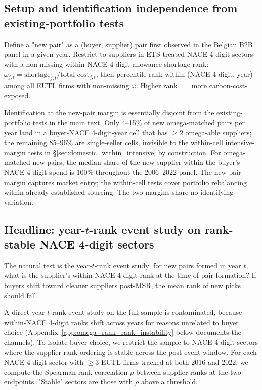 \subsection{Setup and identification independence from existing-portfolio tests}\label{app:omega_rank_setup}

Define a "new pair" as a (buyer, supplier) pair first observed in the Belgian B2B panel in a given year. Restrict to suppliers in ETS-treated NACE 4-digit sectors with a non-missing within-NACE 4-digit allowance-shortage rank: $\omega_{j,t} = \text{shortage}_{j,t} / \text{total cost}_{j,t}$, then percentile-rank within (NACE 4-digit, year) among all EUTL firms with non-missing $\omega$. Higher rank $=$ more carbon-cost-exposed.

Identification at the new-pair margin is essentially disjoint from the existing-portfolio tests in the main text. Only 4--15\% of new omega-matched pairs per year land in a buyer-NACE 4-digit-year cell that has $\geq 2$ omega-able suppliers; the remaining 85--96\% are single-seller cells, invisible to the within-cell intensive-margin tests in §\ref{sec:domestic_within_intensive} by construction. For omega-matched new pairs, the median share of the new supplier within the buyer's NACE 4-digit spend is $100\%$ throughout the 2006--2022 panel. The new-pair margin captures market entry; the within-cell tests cover portfolio rebalancing within already-established sourcing. The two margins share no identifying variation.

\subsection{\texorpdfstring{Headline: year-$t$-rank event study on rank-stable NACE 4-digit sectors}{Headline: year-t-rank event study on rank-stable NACE 4-digit sectors}}\label{app:omega_rank_headline}

The natural test is the year-$t$-rank event study: for new pairs formed in year $t$, what is the supplier's within-NACE 4-digit rank at the time of pair formation? If buyers shift toward cleaner suppliers post-MSR, the mean rank of new picks should fall.

A direct year-$t$-rank event study on the full sample is contaminated, because within-NACE 4-digit ranks shift across years for reasons unrelated to buyer choice (Appendix~\ref{app:omega_rank_rank_instability} below documents the channels). To isolate buyer choice, we restrict the sample to NACE 4-digit sectors where the supplier rank ordering is stable across the post-event window. For each NACE 4-digit sector with $\geq 3$ EUTL firms tracked at both 2016 and 2022, we compute the Spearman rank correlation $\rho$ between supplier ranks at the two endpoints. "Stable" sectors are those with $\rho$ above a threshold.

